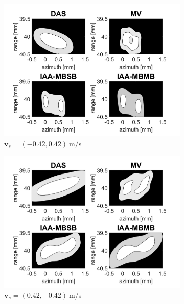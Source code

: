\begin{figure}[ht]
\begin{subfigure}[t]{0.48\linewidth}
        \includegraphics[width=\linewidth]{./images/results/2.2/motion_-45_-06.png}
        \caption{$\boldsymbol{v}_s = (-0.42, 0.42)~$m/s}
    \end{subfigure}
    \quad
    \begin{subfigure}[t]{0.48\linewidth}
        \includegraphics[width=\linewidth]{./images/results/2.2/motion_-45_06.png}
        \caption{$\boldsymbol{v}_s = (0.42, -0.42)~$m/s}
    \end{subfigure}
    \quad
    \begin{subfigure}[t]{0.48\linewidth}

\end{subfigure}
\end{figure}
